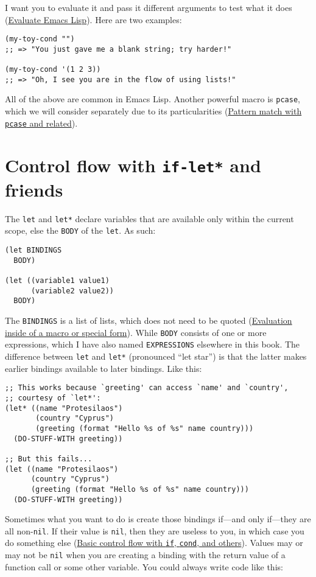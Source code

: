 \documentclass[11pt]{ctexart}
\begin{document}
I want you to evaluate it and pass it different arguments to test what it does (\hyperref[sec:org91f7fd8]{Evaluate Emacs Lisp}). Here are two examples:

\begin{verbatim}
(my-toy-cond "")
;; => "You just gave me a blank string; try harder!"

(my-toy-cond '(1 2 3))
;; => "Oh, I see you are in the flow of using lists!"
\end{verbatim}

All of the above are common in Emacs Lisp. Another powerful macro is \texttt{pcase}, which we will consider separately due to its particularities (\hyperref[sec:orgc256332]{Pattern match with \texttt{pcase} and related}).
\section{Control flow with \texttt{if-let*} and friends}
\label{sec:org8aa5d4d}
The \texttt{let} and \texttt{let*} declare variables that are available only within the current scope, else the \texttt{BODY} of the \texttt{let}. As such:

\begin{verbatim}
(let BINDINGS
  BODY)

(let ((variable1 value1)
      (variable2 value2))
  BODY)
\end{verbatim}

The \texttt{BINDINGS} is a list of lists, which does not need to be quoted (\hyperref[sec:org61e1a1b]{Evaluation inside of a macro or special form}). While \texttt{BODY} consists of one or more expressions, which I have also named \texttt{EXPRESSIONS} elsewhere in this book. The difference between \texttt{let} and \texttt{let*} (pronounced ``let star'') is that the latter makes earlier bindings available to later bindings. Like this:

\begin{verbatim}
;; This works because `greeting' can access `name' and `country',
;; courtesy of `let*':
(let* ((name "Protesilaos")
       (country "Cyprus")
       (greeting (format "Hello %s of %s" name country)))
  (DO-STUFF-WITH greeting))

;; But this fails...
(let ((name "Protesilaos")
      (country "Cyprus")
      (greeting (format "Hello %s of %s" name country)))
  (DO-STUFF-WITH greeting))
\end{verbatim}

Sometimes what you want to do is create those bindings if---and only if---they are all non-\texttt{nil}. If their value is \texttt{nil}, then they are useless to you, in which case you do something else (\hyperref[sec:org9074f8f]{Basic control flow with \texttt{if}, \texttt{cond}, and others}). Values may or may not be \texttt{nil} when you are creating a binding with the return value of a function call or some other variable. You could always write code like this:
\end{document}
